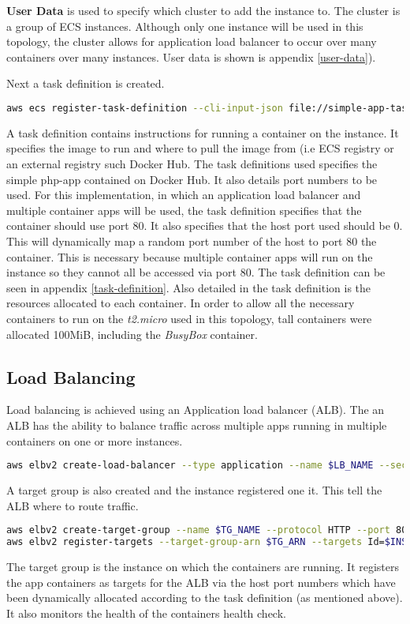 \textbf{User Data} is used to specify which cluster to add the instance to. The cluster is a group of ECS instances. Although only one instance will be used in this topology, the cluster allows for application load balancer to occur over many containers over many instances. User data is shown is appendix \ref{user-data}).


Next a task definition is created.
\begin{lstlisting}[language=bash]
aws ecs register-task-definition --cli-input-json file://simple-app-task-def.json
\end{lstlisting}

A task definition contains instructions for running a container on the instance.  It specifies the image to run and where to pull the image from (i.e ECS registry or an external registry such Docker Hub. The task definitions used specifies the simple php-app contained on Docker Hub. It also details port numbers to be used. For this implementation, in which an application load balancer and multiple container apps will be used, the task definition specifies that the container should use port 80. It also specifies that the host port used should be 0. This will dynamically map a random port number of the host to port 80 the container. This is necessary because multiple container apps will run on the instance so they cannot all be accessed via port 80. The task definition can be seen in appendix \ref{task-definition}.
Also detailed in the task definition is the resources allocated to each container. In order to allow all the necessary containers to run on the \textit{t2.micro} used in this topology, tall containers were allocated 100MiB, including the \textit{BusyBox} container.

\subsection{Load Balancing}
Load balancing is achieved using an Application load balancer (ALB). The an ALB has the ability to balance traffic across multiple apps running in multiple containers on one or more instances.
\begin{lstlisting}[language=bash]
aws elbv2 create-load-balancer --type application --name $LB_NAME --security-groups $HTTPSSH_SEC_GROUP_ID $VPC_SEC_GROUP_ID --subnets $SUBNET_A_ID $SUBNET_B_ID $SUBNET_C_ID
\end{lstlisting}
A target group is also created and the instance registered one it. This tell the ALB where to route traffic.
\begin{lstlisting}[language=bash]
aws elbv2 create-target-group --name $TG_NAME --protocol HTTP --port 80 --vpc-id $VPC_ID --target-type instance --health-check-protocol HTTP --health-check-path "/index.php"
aws elbv2 register-targets --target-group-arn $TG_ARN --targets Id=$INSTANCE_ID
\end{lstlisting}
The target group is the instance on which the containers are running. It registers the app containers as targets for the ALB via the host port numbers which have been dynamically allocated according to the task definition (as mentioned above). It also monitors the health of the containers health check.

